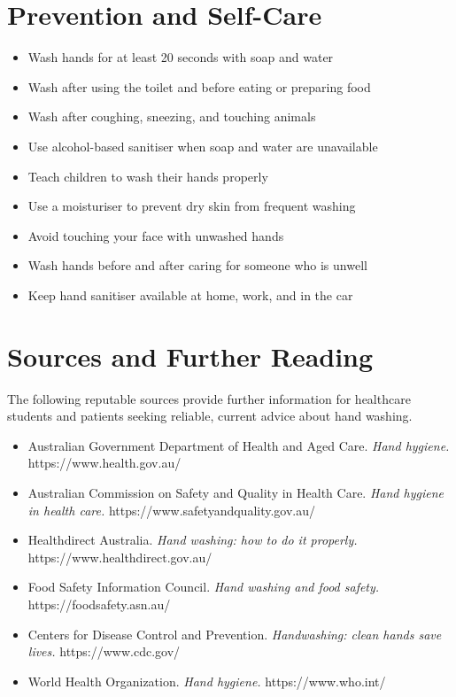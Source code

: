 \section*{Prevention and Self-Care}
\begin{itemize}
    \item Wash hands for at least 20 seconds with soap and water
    \item Wash after using the toilet and before eating or preparing food
    \item Wash after coughing, sneezing, and touching animals
    \item Use alcohol-based sanitiser when soap and water are unavailable
    \item Teach children to wash their hands properly
    \item Use a moisturiser to prevent dry skin from frequent washing
    \item Avoid touching your face with unwashed hands
    \item Wash hands before and after caring for someone who is unwell
    \item Keep hand sanitiser available at home, work, and in the car
\end{itemize}

\section*{Sources and Further Reading}
The following reputable sources provide further information for healthcare students and patients seeking reliable, current advice about hand washing.

\begin{itemize}
    \item Australian Government Department of Health and Aged Care. \textit{Hand hygiene.} https://www.health.gov.au/
    \item Australian Commission on Safety and Quality in Health Care. \textit{Hand hygiene in health care.} https://www.safetyandquality.gov.au/
    \item Healthdirect Australia. \textit{Hand washing: how to do it properly.} https://www.healthdirect.gov.au/
    \item Food Safety Information Council. \textit{Hand washing and food safety.} https://foodsafety.asn.au/
    \item Centers for Disease Control and Prevention. \textit{Handwashing: clean hands save lives.} https://www.cdc.gov/
    \item World Health Organization. \textit{Hand hygiene.} https://www.who.int/
\end{itemize}
